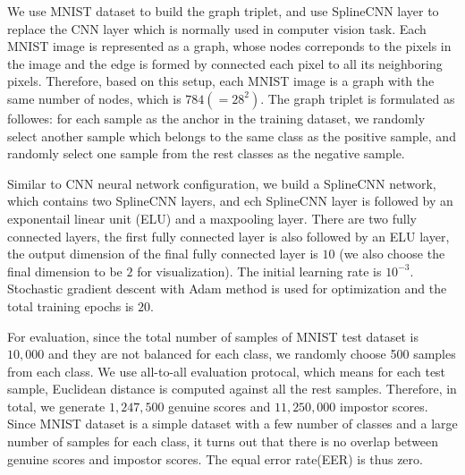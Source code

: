 We use MNIST dataset \cite{LecunIEEE1998} to build the graph triplet, and use SplineCNN layer \cite{FeyCVPR2018splinecnn} \cite{FeyICLR2020DGMC} to replace the CNN layer which is normally used in computer vision task. Each MNIST image is represented as a graph, whose nodes correponds to the pixels in the image and the edge is formed by connected each pixel to all its neighboring pixels. Therefore, based on this setup, each MNIST image is a graph with the same number of nodes, which is $784(=28^2)$. The graph triplet is formulated as followes: for each sample as the anchor in the training dataset, we randomly select another sample which belongs to the same class as the positive sample, and randomly select one sample from the rest classes as the negative sample. 

Similar to CNN neural network configuration, we build a SplineCNN network, which contains two SplineCNN layers, and ech SplineCNN layer is followed by an exponentail linear unit (ELU) and a maxpooling layer. There are two fully connected layers, the first fully connected layer is also followed by an ELU layer, the output dimension of the final fully connected layer is $10$ (we also choose the final dimension to be $2$ for visualization). The initial learning rate is $10^{-3}$. Stochastic gradient descent with Adam method is used for optimization and the total training epochs is $20$.

For evaluation, since the total number of samples of MNIST test dataset is $10,000$ and they are not balanced for each class, we randomly choose 500 samples from each class. We use all-to-all evaluation protocal, which means for each test sample, Euclidean distance is computed against all the rest samples. Therefore, in total, we generate $1,247,500$ genuine scores and $11,250,000$ impostor scores. Since MNIST dataset is a simple dataset with a few number of classes and a large number of samples for each class, it turns out that there is no overlap between genuine scores and impostor scores. The equal error rate(EER) is thus zero.

